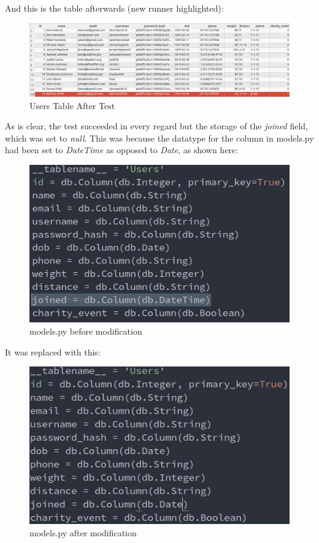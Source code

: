 \documentclass{article}[12pt,a4paper]
\begin{document}
And this is the table afterwards (new runner highlighted):

\begin{figure}[h!]
  \includegraphics[scale=0.34]{images/testing/add_user/database_after_broken}
  \caption{Users Table After Test}
\end{figure}

\clearpage

As is clear, the test succeeded in every regard but the storage of the \textit{joined} field, which was set to \textit{null}. This was because the datatype for the column in models.py had been set to \textit{DateTime} as opposed to \textit{Date}, as shown here:

\begin{figure}[h!]
    \includegraphics[scale=0.5]{images/testing/add_user/code_before}
    \caption{models.py before modification}
\end{figure}

It was replaced with this:

\begin{figure}[h!]
    \includegraphics[scale=0.5]{images/testing/add_user/code_after}
    \caption{models.py after modification}
\end{figure}
\end{document}
